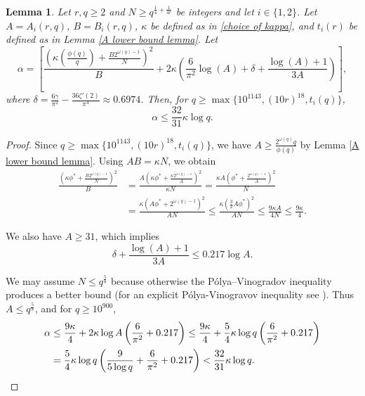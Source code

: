 \documentclass[12pt]{amsart}
\theoremstyle{plain}
\newtheorem{lemma}[theorem]{Lemma}
\theoremstyle{definition}
\begin{document}
\begin{lemma}\label{lem: alpha bound}
Let $r,q\ge 2$ and $N \ge q^{\frac{1}{4}+\frac{1}{4r}} $ be integers and let $i \in \{1,2\}$. Let $A = A_i(r,q)$, $B = B_i(r,q)$, $\kappa$ be defined as in \eqref{choice of kappa}, and $t_i(r)$ be defined as in Lemma \ref{A lower bound lemma}.
Let
\begin{equation*}
    \alpha
    =
    \left[ \frac{\left(\kappa\left(\frac{\phi(q)}{q}\right)+\frac{B2^{\omega(q)-1}}{N} \right)^2}{B}
    +
    2\kappa\left(\frac{6}{\pi^2}\log{(A)}+\delta+\frac{\log{(A)}+1}{3A}\right)\right],
\end{equation*}
where $\delta = \frac{6\gamma}{\pi^2} - \frac{36\zeta'(2)}{\pi^4} \approx 0.6974 $.
Then, for $q\ge \max\{10^{1143}, (10r)^{18}, t_i(q)\}$,
$$\alpha \le \frac{32}{31}\kappa \log{q}.$$
\end{lemma}

\begin{proof}
Since $q\ge \max\{10^{1143}, (10r)^{18}, t_i(q)\}$, we have $A \ge \frac{2^{\omega(q)}q}{\phi(q)}$ by Lemma \ref{A lower bound lemma}. Using $AB = \kappa N$, we obtain
\begin{align*}
\frac{\left(\kappa\phi^*+\frac{B2^{\omega(q)-1}}{N} \right)^2}{B} &= \frac{A\left(\kappa\phi^*+\frac{\kappa 2^{\omega(q)-1}}{A}\right)^2}{\kappa N} = \frac{\kappa A \left(\phi^* + \frac{2^{\omega(q)-1}}{A}\right)^2}{N}\\
&= \frac{\kappa(A\phi^* + 2^{\omega(q)-1})^2}{AN} \le \frac{\kappa \left(\frac{3}{2} A\phi^*\right)^2}{AN} \le \frac{9\kappa A}{4 N} \le \frac{9\kappa}{4}.
\end{align*}

We also have $A\ge 31$, which implies
$$\delta + \frac{\log{(A)}+1}{3A} \le 0.217\log{A}.$$

We may assume $N\le q^\frac{5}{8}$ because otherwise the P\'olya--Vinogradov inequality produces a better bound (for an explicit P\'olya-Vinogravov inequality see \cite{FroSo}). Thus $A\le q^{\frac{5}{8}}$, and for $q \ge 10^{900}$,
\begin{align*}
\alpha &\le \frac{9\kappa}{4} + 2\kappa\log{A}\left(\frac{6}{\pi^2} + 0.217\right) \le \frac{9\kappa}{4} + \frac{5}{4}\kappa\log{q} \left(\frac{6}{\pi^2}+0.217\right) \\&= \frac{5}{4}\kappa\log{q}\left(\frac{9}{5\log{q}} + \frac{6}{\pi^2} + 0.217\right) < \frac{32}{31}\kappa\log{q}.
\qedhere
\end{align*}
\end{proof}
\end{document}
